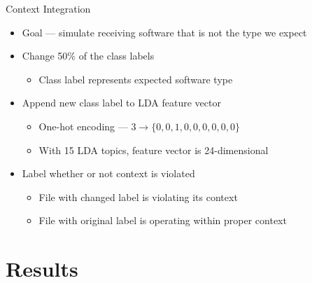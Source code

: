 \documentclass[handout,11pt]{beamer}
\begin{document}
	\begin{frame}{Context Integration}
		\begin{itemize}
			\item Goal --- simulate receiving software that is not the type we expect
			\item Change 50\% of the class labels
				\begin{itemize}
					\item Class label represents expected software type
				\end{itemize}
			\item Append new class label to LDA feature vector
				\begin{itemize}
					\item One-hot encoding ---
						$3 \rightarrow \{0, 0, 1, 0, 0, 0, 0, 0, 0\}$
					\item With 15 LDA topics, feature vector is 24-dimensional
				\end{itemize}
			\item Label whether or not context is violated
				\begin{itemize}
					\item File with changed label is violating its context
					\item File with original label is operating within proper context
				\end{itemize}
		\end{itemize}
	\end{frame}

	\section{Results}
\end{document}
